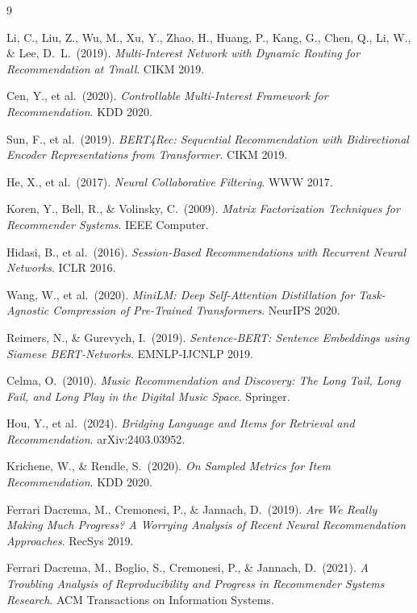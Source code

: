 \documentclass[11pt,a4paper]{article}
\begin{document}
\begin{thebibliography}{9}

Li, C., Liu, Z., Wu, M., Xu, Y., Zhao, H., Huang, P., Kang, G., Chen, Q.,
Li, W., \& Lee, D.\ L.\ (2019).
\textit{Multi-Interest Network with Dynamic Routing for Recommendation
at Tmall}.
CIKM 2019.

Cen, Y., et al.\ (2020).
\textit{Controllable Multi-Interest Framework for Recommendation}.
KDD 2020.

Sun, F., et al.\ (2019).
\textit{BERT4Rec: Sequential Recommendation with Bidirectional Encoder
Representations from Transformer}.
CIKM 2019.

He, X., et al.\ (2017).
\textit{Neural Collaborative Filtering}.
WWW 2017.

Koren, Y., Bell, R., \& Volinsky, C.\ (2009).
\textit{Matrix Factorization Techniques for Recommender Systems}.
IEEE Computer.

Hidasi, B., et al.\ (2016).
\textit{Session-Based Recommendations with Recurrent Neural Networks}.
ICLR 2016.

Wang, W., et al.\ (2020).
\textit{MiniLM: Deep Self-Attention Distillation for Task-Agnostic
Compression of Pre-Trained Transformers}.
NeurIPS 2020.

Reimers, N., \& Gurevych, I.\ (2019).
\textit{Sentence-BERT: Sentence Embeddings using Siamese BERT-Networks}.
EMNLP-IJCNLP 2019.

Celma, O.\ (2010).
\textit{Music Recommendation and Discovery: The Long Tail, Long Fail, and Long Play in the Digital Music Space}.
Springer.

Hou, Y., et al.\ (2024).
\textit{Bridging Language and Items for Retrieval and Recommendation}.
arXiv:2403.03952.

Krichene, W., \& Rendle, S.\ (2020).
\textit{On Sampled Metrics for Item Recommendation}.
KDD 2020.

Ferrari Dacrema, M., Cremonesi, P., \& Jannach, D.\ (2019).
\textit{Are We Really Making Much Progress? A Worrying Analysis of Recent
Neural Recommendation Approaches}.
RecSys 2019.

Ferrari Dacrema, M., Boglio, S., Cremonesi, P., \& Jannach, D.\ (2021).
\textit{A Troubling Analysis of Reproducibility and Progress in
Recommender Systems Research}.
ACM Transactions on Information Systems.


\end{thebibliography}
\end{document}

